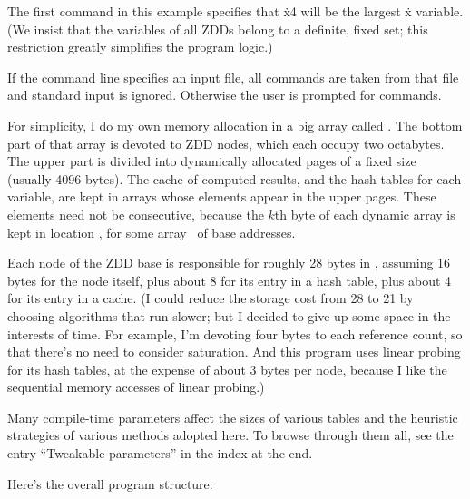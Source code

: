 The first command in this example
specifies that \.{x4} will be the largest \.x variable.
(We insist that the variables of all ZDDs belong to a definite, fixed set;
this restriction greatly simplifies the program logic.)

If the command line specifies an input file, all commands are taken
from that file and standard input is ignored. Otherwise the user is
prompted for commands.

\fi

For simplicity, I do my own memory allocation in a big array
called . The bottom part of that array is devoted to
ZDD nodes, which each occupy two octabytes. The upper part
is divided into dynamically allocated pages of a fixed size
(usually 4096 bytes). The cache of computed results, and
the hash tables for each variable, are kept in arrays whose elements
appear in the upper pages. These elements
need not be consecutive, because the $k$th byte of each dynamic array
is kept in location , for
some array~ of base
addresses.

Each node of the ZDD base is responsible for roughly 28 bytes in ,
assuming 16 bytes for the node itself, plus about 8 for its entry in
a hash table, plus about 4 for its entry in a cache. (I could reduce
the storage cost from 28 to 21 by choosing algorithms that run slower; but I
decided to give up some space in the interests of time. For example,
I'm devoting four bytes to each reference count, so that there's no
need to consider saturation. And this program uses linear probing for
its hash tables, at the expense of about 3 bytes per node, because
I like the sequential memory accesses of linear probing.)

Many compile-time parameters affect the sizes of various tables and the
heuristic strategies of various methods adopted here.
To browse through them all, see the entry ``Tweakable parameters''
in the index at the end.

\fi

Here's the overall program structure:

